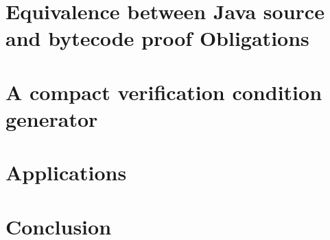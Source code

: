 \documentclass[book,10pt]{book}
\begin{document}
\chapter{Equivalence between Java source and bytecode proof Obligations}





\chapter{A compact verification condition generator}



\chapter{Applications} 

 
\chapter{Conclusion}

\appendix



\end{document}
